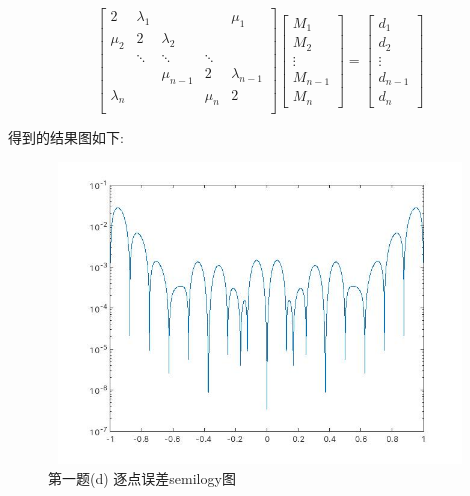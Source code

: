 \documentclass[12pt,a4paper,utf8]{ctexart}
\begin{document}
\begin{enumerate}
\begin{equation}
   \left[
   \begin{array}{cccccccccccc}
    2          & \lambda_1 &        &           & \mu_1  \\
    \mu_2      & 2      & \lambda_2 &           &        \\
               & \ddots & \ddots    & \ddots    &        \\
               &        & \mu_{n-1} & 2         & \lambda_{n-1} \\
    \lambda_n  &        &           & \mu_n     & 2      \\
   \end{array}
   \right ]
   \left[
   \begin{array}{cccc}
    M_{1}\\
    M_{2}\\
    \vdots \\
    M_{n-1}\\
    M_{n}
   \end{array}
   \right ]
   =
   \left[
   \begin{array}{cccc}

      d_{1}\\
      d_{2}\\
      \vdots \\
      d_{n-1}\\
      d_{n}
   \end{array}
   \right ]
   \end{equation}

\newpage
得到的结果图如下:

\begin{figure}[htbp]
   \centering
   \includegraphics[width=15cm,height=8cm]{ex1d1.jpg}
   \caption{第一题(d) 逐点误差semilogy图}
\end{figure}


\end{enumerate}
\end{document}
